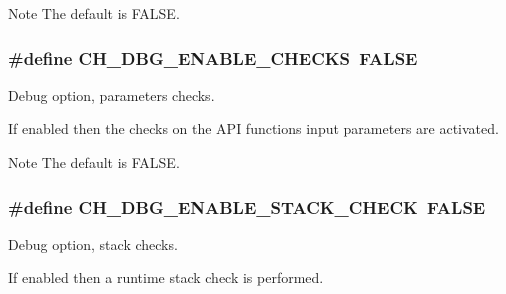 \begin{DoxyNote}{Note}
The default is {\ttfamily F\+A\+L\+S\+E}. 
\end{DoxyNote}
\hypertarget{group__config_gaef984ca3bfd8a71478ad55ce6e56a8bb}{
\subsubsection[{C\+H\+\_\+\+D\+B\+G\+\_\+\+E\+N\+A\+B\+L\+E\+\_\+\+C\+H\+E\+C\+K\+S}]{\setlength{\rightskip}{0pt plus 5cm}\#define C\+H\+\_\+\+D\+B\+G\+\_\+\+E\+N\+A\+B\+L\+E\+\_\+\+C\+H\+E\+C\+K\+S~F\+A\+L\+S\+E}}\label{group__config_gaef984ca3bfd8a71478ad55ce6e56a8bb}


Debug option, parameters checks. 

If enabled then the checks on the A\+P\+I functions input parameters are activated.

\begin{DoxyNote}{Note}
The default is {\ttfamily F\+A\+L\+S\+E}. 
\end{DoxyNote}
\hypertarget{group__config_gab93d9ee904f15d4f2c26ef2a1394a1d7}{
\subsubsection[{C\+H\+\_\+\+D\+B\+G\+\_\+\+E\+N\+A\+B\+L\+E\+\_\+\+S\+T\+A\+C\+K\+\_\+\+C\+H\+E\+C\+K}]{\setlength{\rightskip}{0pt plus 5cm}\#define C\+H\+\_\+\+D\+B\+G\+\_\+\+E\+N\+A\+B\+L\+E\+\_\+\+S\+T\+A\+C\+K\+\_\+\+C\+H\+E\+C\+K~F\+A\+L\+S\+E}}\label{group__config_gab93d9ee904f15d4f2c26ef2a1394a1d7}


Debug option, stack checks. 

If enabled then a runtime stack check is performed.


